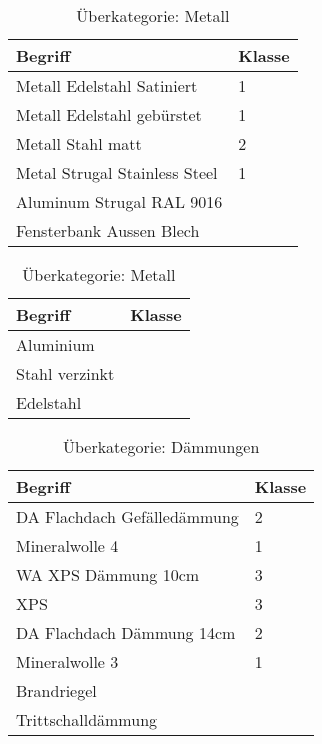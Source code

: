 \begin{table}[h]
	\label{t:evaluation-example10}
	\centering
	\begin{tabular}{|p{}|p{}|}
		\hline
		\textbf{Begriff} & \textbf{Klasse} \\ \hline
		 Metall Edelstahl Satiniert & 1 \\ \hline
		Metall Edelstahl gebürstet & 1 \\ \hline
		Metall Stahl matt & 2 \\ \hline
		Metal Strugal Stainless Steel & 1 \\ \hline
		Aluminum Strugal RAL 9016 & ~ \\ \hline
		Fensterbank Aussen Blech & ~ \\ \hline
	\end{tabular}
	\caption{Überkategorie: Metall}
\end{table}

\begin{table}[h]
	\label{t:evaluation-example11}
	\centering
	\begin{tabular}{|p{}|p{}|}
		\hline
		\textbf{Begriff} & \textbf{Klasse} \\ \hline
		 Aluminium & ~ \\ \hline
		Stahl verzinkt & ~ \\ \hline
		Edelstahl & ~ \\ \hline
	\end{tabular}
	\caption{Überkategorie: Metall}
\end{table}

\begin{table}[h]
	\label{t:evaluation-example12}
	\centering
	\begin{tabular}{|p{}|p{}|}
		\hline
		\textbf{Begriff} & \textbf{Klasse} \\ \hline
		 DA Flachdach Gefälledämmung & 2 \\ \hline
		Mineralwolle 4 & 1 \\ \hline
		WA XPS Dämmung 10cm & 3 \\ \hline
		XPS & 3 \\ \hline
		DA Flachdach Dämmung 14cm & 2 \\ \hline
		Mineralwolle 3 & 1 \\ \hline
		Brandriegel & ~ \\ \hline
		Trittschalldämmung & ~ \\ \hline
	\end{tabular}
	\caption{Überkategorie: Dämmungen}
\end{table}

